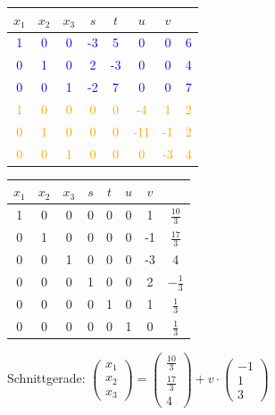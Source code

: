   		\begin{tabular}{| c c c c c c c | c |}
		\hline
		$x_1$ & $x_2$ & $x_3$ & $s$ & $t$ & $u$ & $v$ &  \\
		\hline
		\textcolor{blue}1 & \textcolor{blue}0 & \textcolor{blue}0 & \textcolor{blue}{-3} & \textcolor{blue}5 & \textcolor{blue}0 & \textcolor{blue}0 & \textcolor{blue}6\\
		\textcolor{blue}0 & \textcolor{blue}1 & \textcolor{blue}0 & \textcolor{blue}2 & \textcolor{blue}{-3} & \textcolor{blue}{0} & \textcolor{blue}0 & \textcolor{blue}4\\
		\textcolor{blue}0 & \textcolor{blue}0 & \textcolor{blue}1 & \textcolor{blue}{-2} & \textcolor{blue}7 & \textcolor{blue}0 & \textcolor{blue}0 & \textcolor{blue}7 \\
		\textcolor{orange}1 & \textcolor{orange}0 & \textcolor{orange}0 & \textcolor{orange}0 & \textcolor{orange}0 & \textcolor{orange}{-4} & \textcolor{orange}1 & \textcolor{orange}2 \\
		\textcolor{orange}0 & \textcolor{orange}1 & \textcolor{orange}0 & \textcolor{orange}0 & \textcolor{orange}0 & \textcolor{orange}{-11} & \textcolor{orange}{-1} & \textcolor{orange}2 \\
		\textcolor{orange}0 & \textcolor{orange}0 & \textcolor{orange}1 & \textcolor{orange}0 & \textcolor{orange}0 & \textcolor{orange}0 & \textcolor{orange}{-3} & \textcolor{orange}4 \\
		\hline
		\end{tabular}		
 
  		\begin{tabular}{| c c c c c c c | c |}
		\hline
		$x_1$ & $x_2$ & $x_3$ & $s$ & $t$ & $u$ & $v$ & \\
		\hline
		1 & 0 & 0 & 0 & 0 & 0 & 1 & $\frac{10}{3}$\\
		0 & 1 & 0 & 0 & 0 & 0 & -1 & $\frac{17}{3}$\\
		0 & 0 & 1 & 0 & 0 & 0 & -3 & 4\\
		0 & 0 & 0 & 1 & 0 & 0 & 2 & $-\frac{1}{3}$\\
		0 & 0 & 0 & 0 & 1 & 0 & 1 & $\frac{1}{3}$\\
		0 & 0 & 0 & 0 & 0 & 1 & 0 & $\frac{1}{3}$\\
		\hline
		\end{tabular}		
		
		\vspace{0.2cm}

		Schnittgerade: $\begin{pmatrix} x_1 \\ x_2 \\ x_3 \end{pmatrix} = \begin{pmatrix} \frac{10}{3} \\ \frac{17}{3} \\ 4 \end{pmatrix} + v \cdot \begin{pmatrix} -1 \\ 1 \\ 3 \end{pmatrix} $
		
